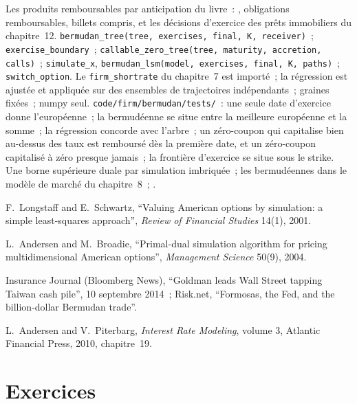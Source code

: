 \begin{build}
 Les produits remboursables par anticipation du livre~: , obligations
remboursables, billets compris, et les décisions d'exercice des prêts immobiliers du chapitre~12.
 \texttt{bermudan\_tree(tree, exercises, final, K, receiver)}~;
\texttt{exercise\_boundary}~; \texttt{callable\_zero\_tree(tree, maturity,
accretion, calls)}~; \texttt{simulate\_x}, \texttt{bermudan\_lsm(model, exercises,
final, K, paths)}~; \texttt{switch\_option}.
 Le \texttt{firm\_shortrate} du chapitre~7 est importé~; la régression est ajustée et
appliquée sur des ensembles de trajectoires indépendants~; graines fixées~; numpy seul.
 \texttt{code/firm/bermudan/tests/}~: une seule date
d'exercice donne l'européenne~; la bermudéenne se situe entre la meilleure européenne et la
somme~; la régression concorde avec l'arbre~; un zéro-coupon qui capitalise bien au-dessus des taux est
remboursé dès la première date, et un zéro-coupon capitalisé à zéro presque jamais~; la
frontière d'exercice se situe sous le strike.
 Une borne supérieure duale par simulation imbriquée~; les bermudéennes dans le modèle de
marché du chapitre~8~; .
\end{build}

\begin{omsources}
\item F.\ Longstaff and E.\ Schwartz, ``Valuing American options by simulation: a
simple least-squares approach'', \emph{Review of Financial Studies} 14(1), 2001.
\item L.\ Andersen and M.\ Broadie, ``Primal-dual simulation algorithm for pricing
multidimensional American options'', \emph{Management Science} 50(9), 2004.
\item Insurance Journal (Bloomberg News), ``Goldman leads Wall Street tapping
Taiwan cash pile'', 10 septembre 2014~; Risk.net, ``Formosas, the Fed, and the
billion-dollar Bermudan trade''.
\item L.\ Andersen and V.\ Piterbarg, \emph{Interest Rate Modeling}, volume 3,
Atlantic Financial Press, 2010, chapitre~19.
\end{omsources}

\section{Exercices}

